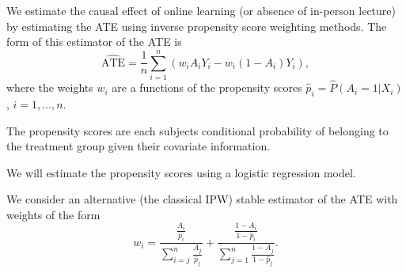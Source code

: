 \documentclass[
  ignorenonframetext,
]{beamer}
\begin{document}
\begin{frame}{}
\protect\hypertarget{section-12}{}
We estimate the causal effect of online learning (or absence of
in-person lecture) by estimating the ATE using inverse propensity score
weighting methods. The form of this estimator of the ATE is \[
 \widehat{\text{ATE}} = \frac{1}{n}\sum_{i=1}^n \left(w_iA_iY_i - w_i(1-A_i)Y_i\right),
\] where the weights \(w_i\) are a functions of the propensity scores
\(\hat{p}_i = \widehat{P}(A_i = 1|X_i)\), \(i = 1,\ldots,n\).

\vspace{12pt}

The propensity scores are each subjects conditional probability of
belonging to the treatment group given their covariate information.

\vspace{12pt}

We will estimate the propensity scores using a logistic regression
model.
\end{frame}

\begin{frame}{}
\protect\hypertarget{section-13}{}
We consider an alternative (the classical IPW) stable estimator of the
ATE with weights of the form \[
  w_i = \frac{\frac{A_i}{\hat{p}_i}}{\sum_{i=j}^n\frac{A_j}{\hat{p}_j}} + \frac{\frac{1-A_i}{1 -\hat{p}_i}}{\sum_{j=1}^n\frac{1-A_j}{1-\hat{p}_j}}.
\]
\end{frame}
\end{document}
